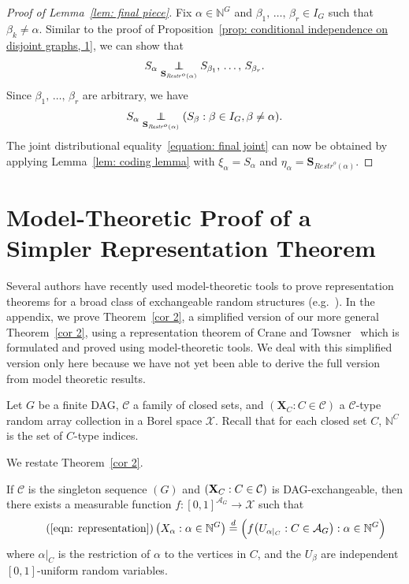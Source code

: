 \documentclass[AHL,Unicode,longabstracts,published]{cedram}
\newcommand{\independent}{\protect\mathpalette{\protect\independenT}{\perp}}\def\independenT#1#2{\mathrel{\rlap{$#1#2$}\mkern2mu{#1#2}}}
\newcommand{\alf}{\alpha}%
\newcommand*\bb{\beta}
\newcommand{\indices}[1]{\mathbb{N}^{#1}}
\renewcommand{\d}{\buildrel{d}\over{=}}
\newcommand*\srstr{\mathit{Restr}^o}
\newcommand*\N{\mathbb{N}}
\renewcommand{\AA}{\mathcal{A}}
\newcommand*\CC{{\mathcal{C}}}
\newcommand*\XX{{\mathcal{X}}}
\newcommand*\bS{\mathbf{S}}
\newcommand*\bX{\mathbf{X}}
\newcommand*\N{\mathbb{N}}
\begin{document}
\begin{proof}[Proof of Lemma~\ref{lem: final piece}] Fix $\alf \in \N^G$ and $\bb_1,\,\ldots,\,\bb_r \in I_G$ such that $\bb_k \neq \alf$. Similar to the proof of Proposition~\ref{prop: conditional independence on disjoint graphs, 1}, we can show that
\[
S_\alf \underset{\bS_{\srstr(\alf)}}{\independent} S_{\bb_1},\,\ldots,\,S_{\bb_r}.
\]
Since $\bb_1,\,\ldots,\,\bb_r$ are arbitrary, we have
\[
S_\alf \underset{\bS_{\srstr(\alf)}}{\independent} (S_\bb : \bb\in I_G, \bb\neq \alf).
\]
The joint distributional equality~\eqref{equation: final joint} can now be obtained by applying Lemma~\ref{lem: coding lemma} with $\xi_\alf=S_\alf$ and $\eta_\alf=\bS_{\srstr(\alf)}$.
\end{proof}



\appendix

\section{Model-Theoretic Proof of a Simpler Representation Theorem}\label{app:model-theoretic-proof}

Several authors have recently used model-theoretic tools to prove representation theorems for a broad class of exchangeable random structures (e.g.~\cite{ackerman2015,ackermanetal-forum-2016,crane2017relative,crane2018relatively}). In the appendix, we prove Theorem~\ref{cor 2}, a simplified version of our more general Theorem~\ref{cor 2}, using a representation theorem of Crane and Towsner~\cite{crane2017relative} which is formulated and proved using model-theoretic tools. We deal with this simplified version only here because we have not yet been able to derive the full version from model theoretic results.

Let $G$ be a finite DAG, $\CC$ a family of closed sets, and ${(\bX_C : C \in \CC)}$ a $\CC$-type random array collection in a Borel space $\XX$. Recall that for each closed set $C$, $\indices C$ is the set of $C$-type indices.

We restate Theorem~\ref{cor 2}.

\begin{theo}
If $\CC$ is the singleton sequence $(G)$ and $(\bX_C : C\linebreak\in \CC)$ is DAG-exchangeable, then there exists a measurable function $f: [0,1]^{\AA_G} \to \XX$ such that
\begin{equation}
\tag{\ref{eqn: representation}}\left(X_\alpha : \alpha \in \indices G\right) \d \Big(f\big(U_{\alpha|_C} : C \in \AA_G\big) : \alpha \in \indices G\Big)
\end{equation}
where $\alpha|_C$ is the restriction of $\alpha$ to the vertices in $C$, and the $U_\beta$ are independent\linebreak$[0,1]$-uniform random variables. 
\end{theo}
\end{document}
